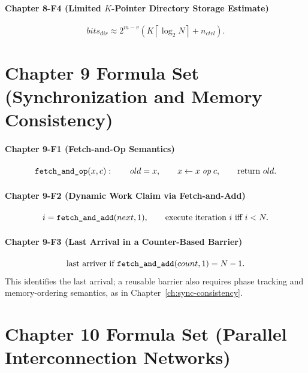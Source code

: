 \paragraph{Chapter 8-F4 (Limited $K$-Pointer Directory Storage Estimate)}\label{par:ch8-formula-4}
\begin{equation}\label{eq:ch8-formula-kdir}
    bits_{dir}\approx 2^{m-v}\left(K\left\lceil \log_2 N \right\rceil + n_{ctrl}\right).
\end{equation}


\section*{Chapter 9 Formula Set (Synchronization and Memory Consistency)}\label{sec:ch9-formulas}

\paragraph{Chapter 9-F1 (Fetch-and-Op Semantics)}\label{par:ch9-formula-1}
\begin{equation}\label{eq:app-ch9-formula-fetchop}
    \text{\texttt{fetch\_and\_op}}(x,c):\qquad old=x,\qquad x\leftarrow x\;\textit{op}\;c,\qquad \text{return } old.
\end{equation}

\paragraph{Chapter 9-F2 (Dynamic Work Claim via Fetch-and-Add)}\label{par:ch9-formula-2}
\begin{equation}\label{eq:app-ch9-formula-work-claim}
    i=\text{\texttt{fetch\_and\_add}}(next,1),\qquad \text{execute iteration } i \text{ iff } i<N.
\end{equation}

\paragraph{Chapter 9-F3 (Last Arrival in a Counter-Based Barrier)}\label{par:ch9-formula-3}
\begin{equation}\label{eq:app-ch9-formula-barrier}
    \text{last arriver if }\text{\texttt{fetch\_and\_add}}(count,1)=N-1.
\end{equation}
This identifies the last arrival; a reusable barrier also requires phase tracking and memory-ordering semantics, as in Chapter~\ref{ch:sync-consistency}.


\section*{Chapter 10 Formula Set (Parallel Interconnection Networks)}\label{sec:ch10-formulas}

